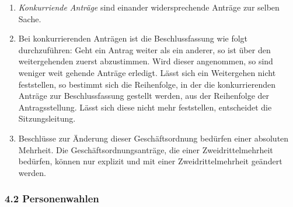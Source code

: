 \begin{enumerate}
\item \emph{Konkurriende Anträge} sind einander widersprechende Anträge zur selben Sache.

\item Bei konkurrierenden Anträgen ist die Beschlussfassung wie folgt durchzuführen:
Geht ein Antrag weiter als ein anderer, so ist über den weitergehenden
zuerst abzustimmen.
Wird dieser angenommen, so sind weniger weit gehende Anträge erledigt.
Lässt sich ein Weitergehen nicht feststellen, so bestimmt sich die
Reihenfolge, in der die konkurrierenden Anträge zur Beschlussfassung
gestellt werden, aus der Reihenfolge der Antragsstellung.
Lässt sich diese nicht mehr feststellen, entscheidet die Sitzungsleitung.

\item Beschlüsse zur Änderung dieser Geschäftsordnung bedürfen einer absoluten
Mehrheit.
Die Geschäftsordnungsanträge, die einer Zweidrittelmehrheit bedürfen, können nur
explizit und mit einer Zweidrittelmehrheit geändert werden.
\end{enumerate}


\subsubsection*{4.2 Personenwahlen%
  \label{personenwahlen}%
}

